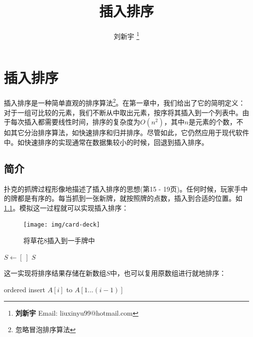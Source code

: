 \documentclass[b5paper]{ctexart}
\begin{document}
\title{插入排序}

\author{刘新宇
\thanks{{\bfseries 刘新宇} \newline
  Email: liuxinyu99@hotmail.com \newline}
  }

\maketitle
\fi


\ifx\wholebook\relax
\chapter{插入排序}
\fi

\lstset{frame = single}
插入排序是一种简单直观的排序算法\footnote{忽略冒泡排序算法}。在第一章中，我们给出了它的简明定义：对于一组可比较的元素，我们不断从中取出元素，按序将其插入到一个列表中。由于每次插入都需要线性时间，排序的复杂度为$O(n^2)$，其中$n$是元素的个数，不如其它分治排序算法，如快速排序和归并排序。尽管如此，它仍然应用于现代软件中。如快速排序的实现通常在数据集较小的时候，回退到插入排序。

\section{简介}
\label{sec:isort-introduction} 
扑克的抓牌过程形像地描述了插入排序的思想(\cite{CLRS}第15 - 19页)。任何时候，玩家手中的牌都是有序的。每当抓到一张新牌，就按照牌的点数，插入到合适的位置。如\cref{fig:hand-of-cards}。模拟这一过程就可以实现插入排序：

\begin{figure}[htbp]
  \centering
  \texttt{[image: img/card-deck]}
  \caption{将草花8插入到一手牌中}
  \label{fig:hand-of-cards}
\end{figure}

\begin{algorithmic}[1]
  \State $S \gets [\ ]$
    \State {}
  \EndFor
  \State \Return $S$
\EndFunction
\end{algorithmic}

这一实现将排序结果存储在新数组$S$中，也可以复用原数组进行就地排序：

\begin{algorithmic}[1]
    \State ordered insert $A[i]$ to $A[1...(i-1)]$
  \EndFor
\EndFunction
\end{algorithmic}
\end{document}
